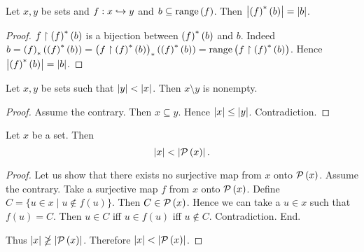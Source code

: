 \documentclass[../set-theory.tex]{subfiles}
\begin{document}
  \begin{forthel}
    \begin{proposition}
      Let $x, y$ be sets and $f : x \hookrightarrow y$ and $b \subseteq \mathrm{range}\left(f\right)$.
      Then $\left\vert\left(f\right)^{*}(b)\right\vert = \left\vert b\right\vert$.
    \end{proposition}
    \begin{proof}
      $f \restriction \left(f\right)^{*}(b)$ is a bijection between $\left(f\right)^{*}(b)$ and $b$.
      Indeed $b
        = \left(f\right)_{*}(\left(f\right)^{*}(b))
        = \left(f \restriction \left(f\right)^{*}(b)\right)_{*}(\left(f\right)^{*}(b))
        = \mathrm{range}\left(f \restriction \left(f\right)^{*}(b)\right)$.
      Hence $\left\vert\left(f\right)^{*}(b)\right\vert = \left\vert b\right\vert$.
    \end{proof}
  \end{forthel}

  \begin{forthel}
    \begin{proposition}
      Let $x, y$ be sets such that $\left\vert y\right\vert < \left\vert x\right\vert$.
      Then $x \setminus y$ is nonempty.
    \end{proposition}
    \begin{proof}
      Assume the contrary.
      Then $x \subseteq y$.
      Hence $\left\vert x\right\vert \leq \left\vert y\right\vert$.
      Contradiction.
    \end{proof}
  \end{forthel}

  \begin{forthel}
    \begin{theorem}
      Let $x$ be a set.
      Then \[ \left\vert x\right\vert < \left\vert\mathcal{P}\left(x\right)\right\vert. \]
    \end{theorem}
    \begin{proof}
      Let us show that there exists no surjective map from $x$ onto $\mathcal{P}\left(x\right)$.
        Assume the contrary.
        Take a surjective map $f$ from $x$ onto $\mathcal{P}\left(x\right)$.
        Define $C = \{ u \in x \mid u \notin f(u) \}$.
        Then $C \in \mathcal{P}\left(x\right)$.
        Hence we can take a $u \in x$ such that $f(u) = C$.
        Then $u \in C$ iff $u \in f(u)$ iff $u \notin C$.
        Contradiction.
      End.

      Thus $\left\vert x\right\vert \ngeq \left\vert\mathcal{P}\left(x\right)\right\vert$.
      Therefore $\left\vert x\right\vert < \left\vert\mathcal{P}\left(x\right)\right\vert$.
    \end{proof}
  \end{forthel}
\end{document}

